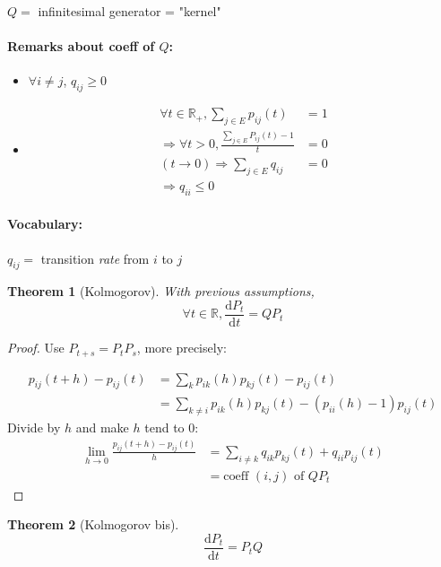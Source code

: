 \documentclass{article}
\newcommand{\deriv}{\mathrm{d}}
\newtheorem{thm}{Theorem}
\begin{document}
$Q=$ infinitesimal generator = "kernel"

\paragraph{Remarks about coeff of $Q$:}
\begin{itemize}
\item $\forall i \neq j$, $q_{ij}\geq 0$
\item 
\begin{align*}
\forall t \in \mathbb{R}_+, \sum_{j\in E} p_{ij}(t)&=1\\
\Rightarrow \forall t>0, \frac{\sum_{j\in E}P_{ij}(t)-1}{t} & =0\\
(t \to 0) \Rightarrow \sum_{j\in E} q_{ij} & = 0\\
\Rightarrow q_{ii}\leq 0
\end{align*}
\end{itemize}

\paragraph{Vocabulary:} $q_{ij}=$ transition \emph{rate} from $i$ to $j$

\begin{thm}[Kolmogorov]
With previous assumptions,
\[\forall t \in \mathbb{R}, \frac{\deriv P_t}{\deriv t} = Q P_t\]
\end{thm}

\begin{proof}
Use $P_{t+s}=P_tP_s$, more precisely:

\begin{align*}
p_{ij}(t+h)-p_{ij}(t) & = \sum_k p_{ik}(h)p_{kj}(t) - p_{ij}(t)\\
& = \sum_{k\neq i} p_{ik}(h)p_{kj}(t) - (p_{ii}(h)-1)p_{ij}(t)
\end{align*}
Divide by $h$ and make $h$ tend to $0$:
\begin{align*}
\lim_{h\to 0} \frac{p_{ij}(t+h)-p_{ij}(t)}{h} & = \sum_{i\neq k} q_{ik}p_{kj}(t) + q_{ii}p_{ij}(t)\\
& = \text{coeff $(i,j)$ of $QP_t$}
\end{align*}

\end{proof}



\begin{thm}[Kolmogorov bis]
\[\frac{\deriv P_t}{\deriv t} = P_t Q\]
\end{thm}
\end{document}
